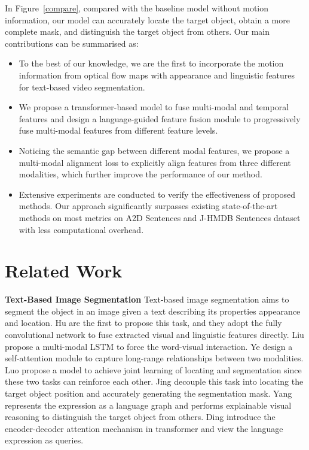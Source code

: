 \documentclass[10pt,twocolumn,letterpaper]{article}
\begin{document}
In Figure~\ref{compare}, compared with the baseline model without motion information, our model can accurately locate the target object, obtain a more complete mask, and distinguish the target object from others. Our main contributions can be summarised as:
   \vspace{-2mm}
\begin{itemize}
   \item To the best of our knowledge, we are the first to incorporate the motion information from optical flow maps with appearance and linguistic features for text-based video segmentation.
\vspace{-2mm}
    \item We propose a transformer-based model to fuse multi-modal and temporal features and design a language-guided feature fusion module to progressively fuse multi-modal features from different feature levels.
\vspace{-2mm}
    \item Noticing the semantic gap between different modal features, we propose a multi-modal alignment loss to explicitly align features from three different modalities, which further improve the performance of our method.
\vspace{-2mm}    
    \item Extensive experiments are conducted to verify the effectiveness of proposed methods. Our approach significantly surpasses existing state-of-the-art methods on most metrics on A2D Sentences and J-HMDB Sentences dataset with less computational overhead.
\end{itemize}




\vspace{-4mm}  
\section{Related Work}
\vspace{-2mm}
\noindent\textbf{Text-Based Image Segmentation} Text-based image segmentation aims to segment the object in an image given a text describing its properties \eg appearance and location.  Hu \etal \cite{hu2016segmentation} are the first to propose this task, and they adopt the fully convolutional network to fuse extracted visual and linguistic features directly. Liu \etal \cite{liu2017recurrent} propose a multi-modal LSTM to force the word-visual interaction. Ye \etal \cite{ye2019cross} design a self-attention module to capture long-range relationships between two modalities. Luo \etal \cite{luo2020multi} propose a model to achieve joint learning of locating and segmentation since these two tasks can reinforce each other. Jing \etal \cite{jing2021locate} decouple this task into locating the target object position and accurately generating the segmentation mask. Yang \etal \cite{yang2021bottom} represents the expression as a language graph and performs explainable visual reasoning to distinguish the target object from others. Ding \etal \cite{ding2021vision} introduce the encoder-decoder attention mechanism in transformer \cite{vaswani2017attention} and view the language expression as queries.
\end{document}
